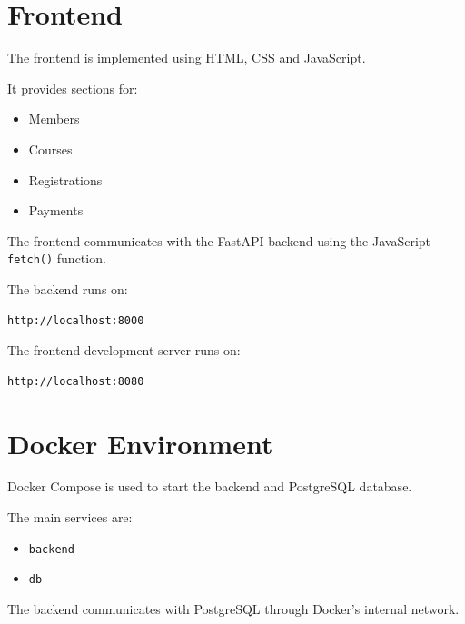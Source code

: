 \documentclass[12pt,a4paper]{article}
\begin{document}

\section{Frontend}

The frontend is implemented using HTML, CSS and JavaScript.

It provides sections for:

\begin{itemize}
    \item Members
    \item Courses
    \item Registrations
    \item Payments
\end{itemize}

The frontend communicates with the FastAPI backend using the
JavaScript \texttt{fetch()} function.

The backend runs on:

\begin{lstlisting}
http://localhost:8000
\end{lstlisting}

The frontend development server runs on:

\begin{lstlisting}
http://localhost:8080
\end{lstlisting}



\section{Docker Environment}

Docker Compose is used to start the backend and PostgreSQL
database.

The main services are:

\begin{itemize}
    \item \texttt{backend}
    \item \texttt{db}
\end{itemize}

The backend communicates with PostgreSQL through Docker's
internal network.


\end{document}
